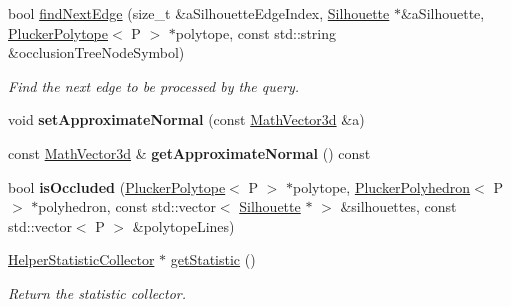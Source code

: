 \begin{DoxyCompactItemize}
\mbox{\label{classvisilib_1_1_visibility_exact_query___ae0bb735eb2795124dee5cc542f754128}} 
bool \mbox{\hyperlink{classvisilib_1_1_visibility_exact_query___ae0bb735eb2795124dee5cc542f754128}{find\+Next\+Edge}} (size\+\_\+t \&a\+Silhouette\+Edge\+Index, \mbox{\hyperlink{classvisilib_1_1_silhouette}{Silhouette}} $\ast$\&a\+Silhouette, \mbox{\hyperlink{classvisilib_1_1_plucker_polytope}{Plucker\+Polytope}}$<$ P $>$ $\ast$polytope, const std\+::string \&occlusion\+Tree\+Node\+Symbol)
\begin{DoxyCompactList}\small\item\em Find the next edge to be processed by the query. \end{DoxyCompactList}\item 
\mbox{\label{classvisilib_1_1_visibility_exact_query___a6d9347605eb40334e880c03f13f079a3}} 
void {\bfseries set\+Approximate\+Normal} (const \mbox{\hyperlink{classvisilib_1_1_math_vector3__}{Math\+Vector3d}} \&a)
\item 
\mbox{\label{classvisilib_1_1_visibility_exact_query___a97cee8287c39ee835236af105cb2d5d6}} 
const \mbox{\hyperlink{classvisilib_1_1_math_vector3__}{Math\+Vector3d}} \& {\bfseries get\+Approximate\+Normal} () const
\item 
\mbox{\label{classvisilib_1_1_visibility_exact_query___acd2ba3fda63141a41efaf91fcbb400ee}} 
bool {\bfseries is\+Occluded} (\mbox{\hyperlink{classvisilib_1_1_plucker_polytope}{Plucker\+Polytope}}$<$ P $>$ $\ast$polytope, \mbox{\hyperlink{classvisilib_1_1_plucker_polyhedron}{Plucker\+Polyhedron}}$<$ P $>$ $\ast$polyhedron, const std\+::vector$<$ \mbox{\hyperlink{classvisilib_1_1_silhouette}{Silhouette}} $\ast$ $>$ \&silhouettes, const std\+::vector$<$ P $>$ \&polytope\+Lines)
\item 
\mbox{\label{classvisilib_1_1_visibility_exact_query___aa46af713c8a69cf466ed30601d6c2c7b}} 
\mbox{\hyperlink{classvisilib_1_1_helper_statistic_collector}{Helper\+Statistic\+Collector}} $\ast$ \mbox{\hyperlink{classvisilib_1_1_visibility_exact_query___aa46af713c8a69cf466ed30601d6c2c7b}{get\+Statistic}} ()
\begin{DoxyCompactList}\small\item\em Return the statistic collector. \end{DoxyCompactList}\item 

\end{DoxyCompactItemize}
